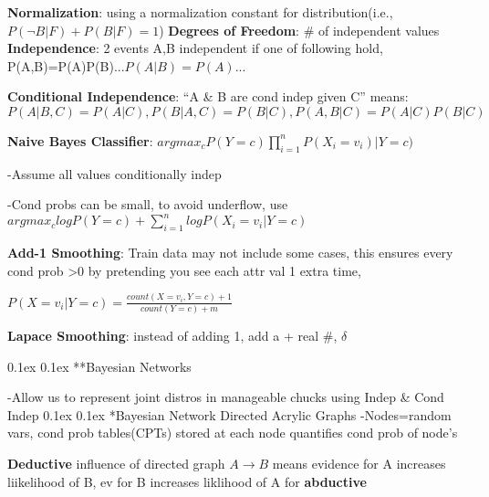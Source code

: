 \documentclass[10pt,landscape]{article}
\makeatletter
\renewcommand{\section}{\@startsection{section}{1}{0mm}%
                                {0.1ex}%
                                {0.1ex}%
                                {\normalfont\normalsize\bfseries}}
\renewcommand{\subsection}{\@startsection{subsection}{2}{0mm}%
                                {0.1ex}%
                                {0.1ex}%
                                {\normalfont\footnotesize\bfseries}}
\makeatother
\begin{document}
\begin{multicols}{3}
\textbf{Normalization}: using a normalization constant for distribution(i.e., $P(\neg B|F)+P(B|F)=1$)
\textbf{Degrees of Freedom}: \# of independent values
\textbf{Independence}: 2 events A,B independent if one of following hold, P(A,B)=P(A)P(B)...$P(A|B)=P(A)...$

\textbf{Conditional Independence}: ``A \& B are cond indep given C'' means: $P(A|B,C)=P(A|C), P(B|A,C)=P(B|C), P(A,B|C)=P(A|C)P(B|C)$

\textbf{Naive Bayes Classifier}: $argmax_cP(Y=c)\prod_{i=1}^nP(X_i=v_i)|Y=c)$

-Assume all values conditionally indep

-Cond probs can be small, to avoid underflow, use $argmax_c logP(Y=c)+\sum_{i=1}^nlogP(X_i=v_i|Y=c)$

\textbf{Add-1 Smoothing}: Train data may not include some cases, this ensures every cond prob >0 by pretending you see each attr val 1 extra time,

$P(X=v_i|Y=c)=\frac{count(X=v_i,Y=c)+1}{count(Y=c)+m}$



\textbf{Lapace Smoothing}: instead of adding 1, add a + real \#, $\delta$

\section{**Bayesian Networks} 

-Allow us to represent joint distros in manageable chucks using Indep \& Cond Indep
\subsection{*Bayesian Network Directed Acrylic Graphs}
-Nodes=random vars, cond prob tables(CPTs) stored at each node quantifies cond prob of node's

\textbf{Deductive} influence of directed graph $A\to B$ means evidence for A increases liikelihood of B, ev for B increases liklihood of A for \textbf{abductive}


\end{multicols}
\end{document}
